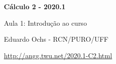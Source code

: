 \documentclass[oneside,12pt]{article}
\begin{document}


\long{}
\long{}
\long{}
\long{}
\long{}
\long{}
\long{}
\long{}
\long{}
\long{}

\long{}
\long{}

\def\frown{\ensuremath{{=}{(}}}
\def\True {\mathbf{V}}
\def\False{\mathbf{F}}

\def\drafturl{http://angg.twu.net/LATEX/2020-1-C2.pdf}
\def\drafturl{http://angg.twu.net/2020.1-C2.html}
\def\draftfooter{\tiny \href{\drafturl}{\jobname{}} \ColorBrown{\shorttoday{} \hours}}






%

\thispagestyle{empty}

\begin{center}

\vspace*{1.2cm}

{\bf \Large Cálculo 2 - 2020.1}

\bsk

Aula 1: Introdução ao curso

\bsk

Eduardo Ochs - RCN/PURO/UFF

\url{http://angg.twu.net/2020.1-C2.html}

\end{center}

\newpage
\end{document}
